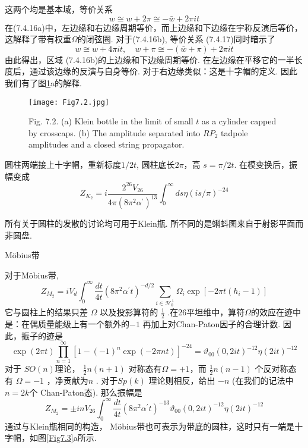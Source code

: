 这两个均是基本域，等价关系
\begin{equation}
	w \cong w+2 \pi \cong-\bar{w}+2 \pi i t
\end{equation}
在(7.4.16a)中，左边缘和右边缘周期等价，而上边缘和下边缘在宇称反演后等价，这解释了带有权重$\Omega $的闭弦圈. 对于(7.4.16b), 等价关系 (7.4.17)同时暗示了
\begin{equation}
	w \cong w+4 \pi i t, \quad w+\pi \cong-(\bar{w}+\pi)+2 \pi i t
\end{equation}
由此得出，区域 (7.4.16b)的上边缘和下边缘周期等价. 在左边缘在平移它的一半长度后，通过该边缘的反演与自身等价. 对于右边缘类似：这是十字帽的定义. 因此我们有了图\ref{Fig7.2}a的解释. \\
\begin{figure}
	\begin{center}
		\texttt{[image: Fig7.2.jpg]}\\
		\caption{Fig. 7.2. (a) Klein bottle in the limit of small $t$ as a cylinder capped by crosscaps. (b) The amplitude separated into $R P_{2}$ tadpole amplitudes and a closed string propagator.}\label{Fig7.2}
	\end{center}
\end{figure}

圆柱两端接上十字帽，重新标度$1 / 2 t$, 圆柱底长$2 \pi$，高 $s=\pi / 2 t$. 在模变换后，振幅变成
\begin{equation}
	Z_{K_{2}}=i \frac{2^{26} V_{26}}{4 \pi\left(8 \pi^{2} \alpha^{\prime}\right)^{13}} \int_{0}^{\infty} d s \eta(i s / \pi)^{-24}
\end{equation}

所有关于圆柱的发散的讨论均可用于Klein瓶. 所不同的是蝌蚪图来自于射影平面而非圆盘.\\

\centerline{\Large Möbius带}
对于Möbius带,
\begin{equation}
	Z_{M_{2}}=i V_{d} \int_{0}^{\infty} \frac{d t}{4 t}\left(8 \pi^{2} \alpha^{\prime} t\right)^{-d / 2} \sum_{i \in \mathscr{H}_{0}^{\perp}} \Omega_{i} \exp \left[-2 \pi t\left(h_{i}-1\right)\right]
\end{equation}
它与圆柱上的结果只差 $\Omega$ 以及投影算符的 $\frac{1}{2}$ .在26平坦维中，算符$\Omega$的效应在迹中是：在偶质量能级上有一个额外的$-1$ 再加上对Chan-Paton因子的合理计数. 因此，振子的迹是
\begin{equation}
	\exp (2 \pi t) \prod_{n=1}^{\infty}\left[1-(-1)^{n} \exp (-2 \pi n t)\right]^{-24}=\vartheta_{00}(0,2 i t)^{-12} \eta(2 i t)^{-12}
\end{equation}
对于 $S O(n)$理论， $\frac{1}{2} n(n+1)$ 对称态有$\Omega=+1$，而 $\frac{1}{2} n(n-1)$ 个反对称态有 $\Omega=-1$ ，净贡献为$n$ . 对于$S p(k)$ 理论则相反，给出 $-n$ (在我们的记法中$n=2 k$个 Chan-Paton态). 那么振幅是
\begin{equation}
	Z_{M_{2}}=\pm i n V_{26} \int_{0}^{\infty} \frac{d t}{4 t}\left(8 \pi^{2} \alpha^{\prime} t\right)^{-13} \vartheta_{00}(0,2 i t)^{-12} \eta(2 i t)^{-12}
\end{equation}
通过与Klein瓶相同的构造， Möbius带也可表示为带底的圆柱，这时只有一端是十字帽，如图\ref{Fig7.3}a所示. 

